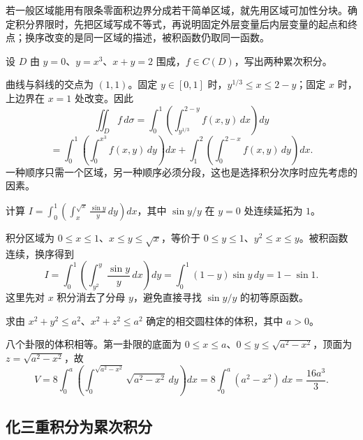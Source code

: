 若一般区域能用有限条零面积边界分成若干简单区域，就先用区域可加性分块。确定积分界限时，先把区域写成不等式，再说明固定外层变量后内层变量的起点和终点；换序改变的是同一区域的描述，被积函数仍取同一函数。

\begin{example}
\label{ex:multiple-cubic-line-domain}
设 $D$ 由 $y=0$、$y=x^3$、$x+y=2$ 围成，$f\in C(D)$，写出两种累次积分。
\end{example}
\begin{solve}
曲线与斜线的交点为 $(1,1)$。固定 $y\in[0,1]$ 时，$y^{1/3}\leq x\leq2-y$；固定 $x$ 时，上边界在 $x=1$ 处改变。因此
\[
    \iint_Df\,d\sigma
    =\int_0^1\left(\int_{y^{1/3}}^{2-y}f(x,y)\,dx\right)dy
\]
\[
    =\int_0^1\left(\int_0^{x^3}f(x,y)\,dy\right)dx
    +\int_1^2\left(\int_0^{2-x}f(x,y)\,dy\right)dx.
\]
一种顺序只需一个区域，另一种顺序必须分段，这也是选择积分次序时应先考虑的因素。
\end{solve}

\begin{example}
\label{ex:multiple-change-order-sinc}
计算 $\displaystyle I=\int_0^1\left(\int_x^{\sqrt x}\frac{\sin y}{y}\,dy\right)dx$，其中 $\sin y/y$ 在 $y=0$ 处连续延拓为 $1$。
\end{example}
\begin{solve}
积分区域为 $0\leq x\leq1$、$x\leq y\leq\sqrt x$，等价于 $0\leq y\leq1$、$y^2\leq x\leq y$。被积函数连续，换序得到
\[
    I=\int_0^1\left(\int_{y^2}^y\frac{\sin y}{y}\,dx\right)dy
    =\int_0^1(1-y)\sin y\,dy=1-\sin1.
\]
这里先对 $x$ 积分消去了分母 $y$，避免直接寻找 $\sin y/y$ 的初等原函数。
\end{solve}

\begin{example}
\label{ex:multiple-two-cylinders-volume}
求由 $x^2+y^2\leq a^2$、$x^2+z^2\leq a^2$ 确定的相交圆柱体的体积，其中 $a>0$。
\end{example}
\begin{solve}
八个卦限的体积相等。第一卦限的底面为 $0\leq x\leq a$、$0\leq y\leq\sqrt{a^2-x^2}$，顶面为 $z=\sqrt{a^2-x^2}$，故
\[
    V=8\int_0^a\left(\int_0^{\sqrt{a^2-x^2}}\sqrt{a^2-x^2}\,dy\right)dx
    =8\int_0^a(a^2-x^2)\,dx=\frac{16a^3}{3}.
\]
\end{solve}

\subsection{化三重积分为累次积分}
\label{subsec:reduction-of-triple-integrals-to-iterated-integrals}

